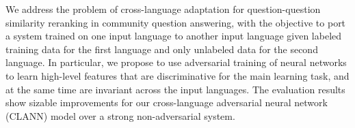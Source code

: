We address the problem of cross-language adaptation for question-question similarity reranking in community question answering, with the objective to port a system trained on one input language to another input language given labeled training data for the first language and only unlabeled data for the second language. In particular, we propose to use adversarial training of neural networks to learn high-level features that are discriminative for the main learning task, and at the same time are invariant across the input languages. The evaluation results show sizable improvements for our cross-language adversarial neural network (CLANN) model over a strong non-adversarial system.
